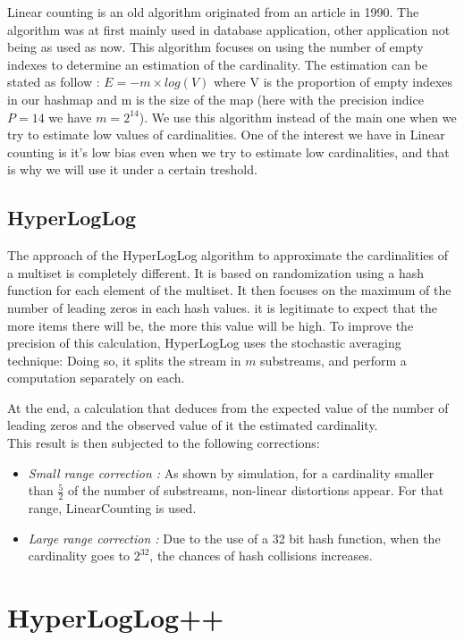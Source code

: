 \documentclass{article}
\begin{document}
Linear counting is an old algorithm originated from an article in
1990. The algorithm was at first mainly used in database application,
other application not being as used as now. This algorithm focuses on
using the number of empty indexes to determine an estimation of the
cardinality. The estimation can be stated as follow : $E = -m\times
log(V)$ where V is the proportion of empty indexes in our hashmap and
m is the size of the map (here with the precision indice $P=14$ we
have $m=2^{14}$).  We use this algorithm instead of the main one when
we try to estimate low values of cardinalities. One of the interest we
have in Linear counting is it's low bias even when we try to estimate
low cardinalities, and that is why we will use it under a certain
treshold.

\subsection{HyperLogLog}
The approach of the HyperLogLog algorithm to approximate the
cardinalities of a multiset is completely different. It is based on
randomization using a hash function for each element of the
multiset. It then focuses on the maximum of the number of leading
zeros in each hash values. it is legitimate to expect that the more
items there will be, the more this value will be high.  To improve the
precision of this calculation, HyperLogLog uses the stochastic
averaging technique: Doing so, it splits the stream in $m$ substreams,
and perform a computation separately on each.

At the end, a calculation that deduces from the expected value of the
number of leading zeros and the observed value of it the estimated
cardinality.\\
This result is then subjected to the following corrections:
\begin{itemize}
\item \emph{Small range correction :} As shown by simulation, for a
cardinality smaller than $\frac{5}{2}$ of the number of substreams, non-linear
distortions appear. For that range, LinearCounting is used.
\item \emph{Large range correction :} Due to the use of a 32 bit hash
function, when the cardinality goes to $2^{32}$, the chances of hash
collisions increases.
\end{itemize}

\section{HyperLogLog++}
\end{document}
